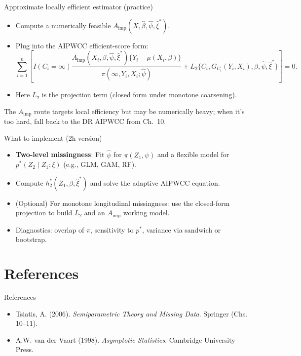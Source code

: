 \documentclass[xcolor=dvipsnames,aspectratio=169]{beamer}
\newcommand{\1}{\mathbbm{1}}
\begin{document}
\begin{frame}{Approximate locally efficient estimator (practice)}
  \begin{itemize}
    \item Compute a numerically feasible $A_{\text{imp}}(X,\hat\beta,\hat\psi,\hat\xi^\ast)$.
    \item Plug into the AIPWCC efficient-score form:
    \[
      \sum_{i=1}^n\left[
        I(C_i=\infty)\frac{A_{\text{imp}}(X_i,\beta,\hat\psi,\hat\xi^\ast)\{Y_i-\mu(X_i,\beta)\}}{\pi(\infty,Y_i,X_i;\hat\psi)}
        +L_2\{C_i,G_{C_i}(Y_i,X_i),\beta,\hat\psi,\hat\xi^\ast\}
      \right]=0.
    \]
    \item Here $L_2$ is the projection term (closed form under monotone coarsening).
  \end{itemize}
  \vspace{2mm}
  \begin{tcolorbox}[title=Robustness note]
  The $A_{\text{imp}}$ route targets local efficiency but may be numerically heavy; when it’s too hard, fall back to the DR AIPWCC from Ch.~10.
  \end{tcolorbox}
\end{frame}

\begin{frame}{What to implement (2h version)}
  \begin{itemize}
    \item \textbf{Two-level missingness}: Fit $\hat\psi$ for $\pi(Z_1,\psi)$ and a flexible model for $p^\ast(Z_2\mid Z_1;\xi)$ (e.g., GLM, GAM, RF).
    \item Compute $h_2^\ast(Z_1,\beta,\hat\xi^\ast)$ and solve the adaptive AIPWCC equation.
    \item (Optional) For monotone longitudinal missingness: use the closed-form projection to build $L_2$ and an $A_{\text{imp}}$ working model.
    \item Diagnostics: overlap of $\pi$, sensitivity to $p^\ast$, variance via sandwich or bootstrap.
  \end{itemize}
\end{frame}

\section*{References}

\begin{frame}{References}
  \begin{itemize}
    \item Tsiatis, A. (2006). \emph{Semiparametric Theory and Missing Data}. Springer (Chs. 10–11).
    \item A.W. van der Vaart (1998). \emph{Asymptotic Statistics}. Cambridge University Press.
  \end{itemize}
\end{frame}
\end{document}

